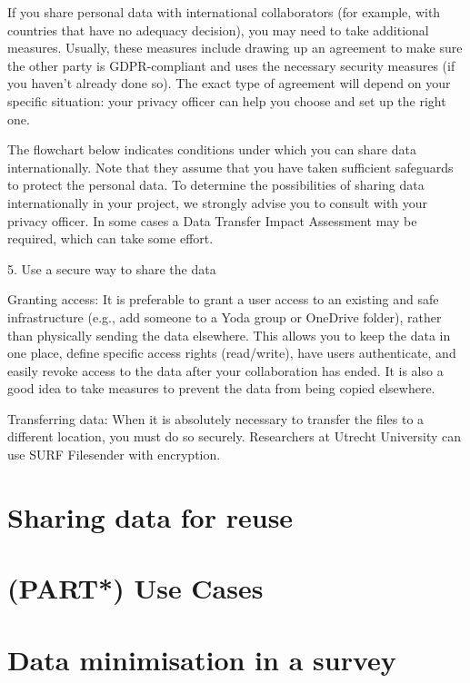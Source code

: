 \documentclass[
]{book}
\begin{document}
If you share personal data with international collaborators (for example,
with countries that have no
adequacy decision),
you may need to take additional measures. Usually, these measures include
drawing up an agreement to make sure the other party is GDPR-compliant and
uses the necessary security measures (if you haven't already done so). The
exact type of agreement will depend on your specific situation: your
privacy officer
can help you choose and set up the right one.

The flowchart below indicates conditions under which you can share data
internationally. Note that they assume that you have taken sufficient
safeguards to protect the personal data. To determine the possibilities
of sharing data internationally in your project, we strongly advise you
to consult with your privacy officer. In some cases a Data Transfer Impact Assessment may
be required, which can take some effort.

5. Use a secure way to share the data

Granting access: It is preferable to grant a user access
to an existing and safe infrastructure (e.g., add someone to a Yoda
group or OneDrive folder), rather than physically sending the data
elsewhere. This allows you to keep the data in one place, define
specific access rights (read/write), have users authenticate, and
easily revoke access to the data after your collaboration has ended.
It is also a good idea to take measures to prevent the data from
being copied elsewhere.

Transferring data: When it is absolutely necessary to
transfer the files to a different location, you must do so securely.
Researchers at Utrecht University can use
SURF Filesender
with encryption.

\hypertarget{data-sharing-reuse}{%
\chapter{Sharing data for reuse}\label{data-sharing-reuse}}

\hypertarget{part-use-cases}{%
\chapter{(PART*) Use Cases}\label{part-use-cases}}

\hypertarget{pet-survey}{%
\chapter{Data minimisation in a survey}\label{pet-survey}}
\end{document}
